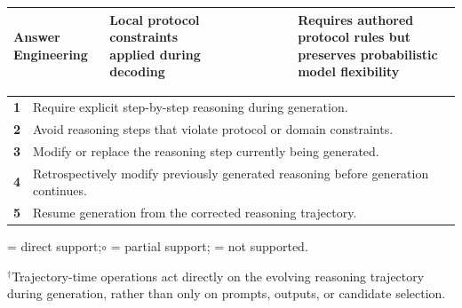 \documentclass[twocolumn]{article}
\newcommand{\cmark}{\ding{51}} \newcommand{\xmark}{\ding{55}}
\newcommand{\partialmark}{\(\circ\)}
\begin{document}
\begin{table}[t]
\begin{tabularx}{\textwidth}{ >{\raggedright\arraybackslash}p{}
      >{\raggedright\arraybackslash}p{} ccccc
      >{\raggedright\arraybackslash}X }
    \textbf{Answer Engineering}
    & \textbf{Local protocol constraints applied during decoding} &
    \textbf{\cmark} & \textbf{\cmark} & \textbf{\cmark} & \textbf{\cmark} &
    \textbf{\cmark} & Requires authored protocol rules but preserves
    probabilistic model flexibility \\

    \bottomrule
  \end{tabularx}

  \vspace{0.6em}


  \begin{tabularx}{\textwidth}{ >{\raggedright\arraybackslash}p{}
    >{\raggedright\arraybackslash}X }
    \toprule
    \multicolumn{2}{l}{\textbf{Trajectory-time operations$^{\dagger}$}} \\
    \midrule

    \textbf{1} & Require explicit step-by-step reasoning during generation. \\

    \textbf{2} & Avoid reasoning steps that violate protocol or domain
    constraints. \\

    \textbf{3} & Modify or replace the reasoning step currently being generated.
    \\

    \textbf{4} & Retrospectively modify previously generated reasoning before
    generation continues. \\

    \textbf{5} & Resume generation from the corrected reasoning trajectory. \\

    \bottomrule
  \end{tabularx}

  \vspace{0.25em}

  {\footnotesize \cmark{} = direct support;\quad \partialmark{} = partial
  support;\quad \xmark{} = not supported. }

  \vspace{0.25em}

  {\footnotesize $^{\dagger}$Trajectory-time operations act directly on the
    evolving reasoning trajectory during generation, rather than only on
    prompts, outputs, or candidate selection. }

\end{table}
\end{document}
